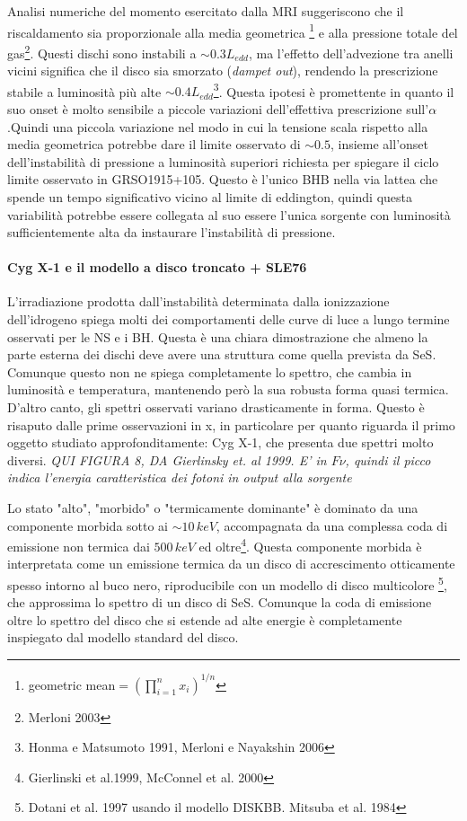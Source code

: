 \documentclass[a4paperbi]{article}
\begin{document}
	Analisi numeriche del momento esercitato dalla MRI suggeriscono che il riscaldamento sia proporzionale alla media geometrica \footnote{geometric mean$=\left(\prod_{i=1}^n x_i\right)^{1/n}$} e alla pressione totale del gas\footnote{Merloni 2003}. Questi dischi sono instabili a $\sim 0.3L_{edd}$, ma l'effetto dell'advezione tra anelli vicini significa che il disco sia smorzato (\textit{dampet out}), rendendo la prescrizione stabile a luminosità più alte $\sim 0.4L_{edd}$\footnote{Honma e Matsumoto 1991, Merloni e Nayakshin 2006}. Questa ipotesi è promettente in quanto il suo onset è molto sensibile a piccole variazioni dell'effettiva prescrizione sull'$\alpha$.Quindi una piccola variazione nel modo in cui la tensione scala rispetto alla media geometrica potrebbe dare il limite osservato di $\sim0.5$, insieme all'onset dell'instabilità di pressione a luminosità superiori richiesta per spiegare il ciclo limite osservato in GRSO1915+105. Questo è l'unico BHB nella via lattea che spende un tempo significativo vicino al limite di eddington, quindi questa variabilità potrebbe essere collegata al suo essere l'unica sorgente con luminosità sufficientemente alta da instaurare l'instabilità di pressione.
	
\paragraph{Cyg X-1 e il modello a disco troncato + SLE76}
L'irradiazione prodotta dall'instabilità determinata dalla ionizzazione dell'idrogeno spiega molti dei comportamenti delle curve di luce a lungo termine osservati per le NS e i BH. Questa è una chiara dimostrazione che almeno la parte esterna dei dischi deve avere una struttura come quella prevista da SeS. Comunque questo non ne spiega completamente lo spettro, che cambia in luminosità e temperatura, mantenendo però la sua robusta forma quasi termica. D'altro canto, gli spettri osservati variano drasticamente in forma. Questo è risaputo dalle prime osservazioni in x, in particolare per quanto riguarda il primo oggetto studiato approfonditamente: Cyg X-1, che presenta due spettri molto diversi.
\emph{QUI FIGURA 8, DA Gierlinsky et. al 1999. E' in $F\nu$, quindi il picco indica l'energia caratteristica dei fotoni in output alla sorgente}

Lo stato "alto", "morbido" o "termicamente dominante" è dominato da una componente morbida sotto ai $\sim10\,keV$, accompagnata da una complessa coda di emissione non termica dai $500\,keV$ ed oltre\footnote{Gierlinski et al.1999, McConnel et al. 2000}. Questa componente morbida è interpretata come un emissione termica da un disco di accrescimento otticamente spesso intorno al buco nero, riproducibile con un modello di disco multicolore \footnote{Dotani et al. 1997 usando il modello DISKBB. Mitsuba et al. 1984}, che approssima lo spettro di un disco di SeS. Comunque la coda di emissione oltre lo spettro del disco che si estende ad alte energie è completamente inspiegato dal modello standard del disco.
\end{document}
